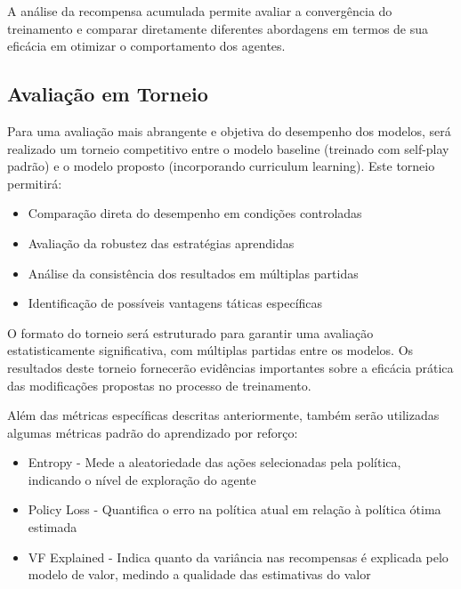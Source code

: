 A análise da recompensa acumulada permite avaliar a convergência do treinamento e comparar diretamente diferentes abordagens em termos de sua eficácia em otimizar o comportamento dos agentes.

\subsection{Avaliação em Torneio}

Para uma avaliação mais abrangente e objetiva do desempenho dos modelos, será realizado um torneio competitivo entre o modelo baseline (treinado com self-play padrão) e o modelo proposto (incorporando curriculum learning). Este torneio permitirá:

\begin{itemize}
    \item Comparação direta do desempenho em condições controladas
    \item Avaliação da robustez das estratégias aprendidas
    \item Análise da consistência dos resultados em múltiplas partidas
    \item Identificação de possíveis vantagens táticas específicas
\end{itemize}

O formato do torneio será estruturado para garantir uma avaliação estatisticamente significativa, com múltiplas partidas entre os modelos. Os resultados deste torneio fornecerão evidências importantes sobre a eficácia prática das modificações propostas no processo de treinamento.


Além das métricas específicas descritas anteriormente, também serão utilizadas algumas métricas padrão do aprendizado por reforço:

\begin{itemize}
    \item Entropy - Mede a aleatoriedade das ações selecionadas pela política, indicando o nível de exploração do agente
    \item Policy Loss - Quantifica o erro na política atual em relação à política ótima estimada
    \item VF Explained - Indica quanto da variância nas recompensas é explicada pelo modelo de valor, medindo a qualidade das estimativas do valor
\end{itemize}


